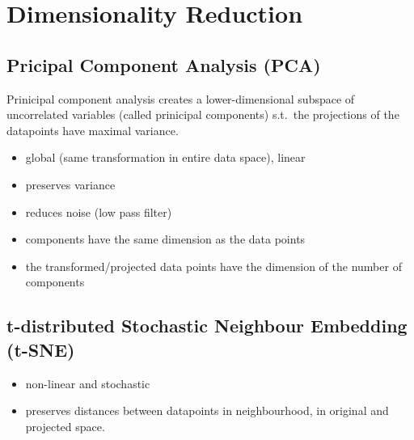 \section{Dimensionality Reduction}

\subsection{Pricipal Component Analysis (PCA)}
Prinicipal component analysis creates a lower-dimensional subspace of uncorrelated variables (called prinicipal components) s.t.\ the projections of the datapoints have maximal variance.

\newpar{}
\begin{itemize}
    \item global (same transformation in entire data space), linear
    \item preserves variance
    \item reduces noise (low pass filter)
    \item components have the same dimension as the data points
    \item the transformed/projected data points have the dimension of the number of components
\end{itemize}

\newpar{}

\subsection{t-distributed Stochastic Neighbour Embedding (t-SNE)}
\begin{itemize}
    \item non-linear and stochastic
    \item preserves distances between datapoints in neighbourhood, in original and projected space.
\end{itemize}